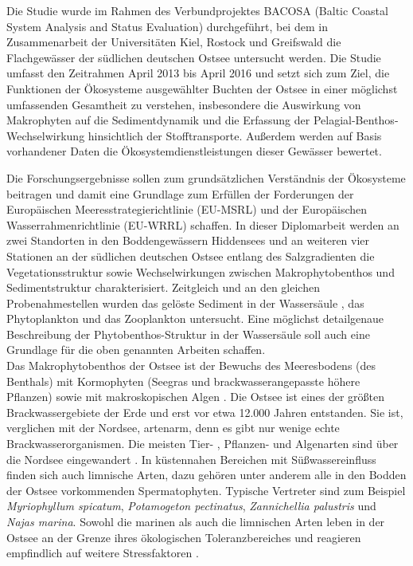 Die Studie wurde im Rahmen des Verbundprojektes BACOSA (Baltic Coastal System Analysis and Status Evaluation) durchgeführt, bei dem in Zusammenarbeit der Universitäten Kiel, Rostock und Greifswald die Flachgewässer der südlichen deutschen Ostsee untersucht werden. Die Studie umfasst den Zeitrahmen April 2013 bis April 2016 und setzt sich zum Ziel, die Funktionen der Ökosysteme ausgewählter Buchten der Ostsee in einer möglichst umfassenden Gesamtheit zu verstehen, insbesondere die Auswirkung von Makrophyten auf die Sedimentdynamik und die Erfassung der Pelagial-Benthos-Wechselwirkung hinsichtlich der Stofftransporte. Außerdem werden auf Basis vorhandener Daten die Ökosystemdienstleistungen dieser Gewässer bewertet. 

Die Forschungsergebnisse sollen zum grundsätzlichen Verständnis der Ökosysteme beitragen und damit eine Grundlage zum Erfüllen der Forderungen der Europäischen Meeresstrategierichtlinie (EU-MSRL) und der Europäischen Wasserrahmenrichtlinie (EU-WRRL) schaffen. In dieser Diplomarbeit werden an zwei Standorten in den Boddengewässern Hiddensees und an weiteren vier Stationen an der südlichen deutschen Ostsee entlang des Salzgradienten die Vegetationsstruktur sowie Wechselwirkungen zwischen Makrophytobenthos und Sedimentstruktur charakterisiert. Zeitgleich und an den gleichen Probenahmestellen wurden das gelöste Sediment in der Wassersäule \citep{kafka_2014}, das Phytoplankton \citep{lindner_2014} und das Zooplankton \citep{nawka_2014} untersucht. Eine möglichst detailgenaue Beschreibung der Phytobenthos-Struktur in der Wassersäule soll auch eine Grundlage für die oben genannten Arbeiten schaffen.
\\
Das Makrophytobenthos der Ostsee ist der Bewuchs des Meeresbodens (des Benthals) mit Kormophyten (Seegras und brackwasserangepasste höhere Pflanzen) sowie mit makroskopischen Algen \citep{schwenke_1995}. Die Ostsee ist eines der größten Brackwassergebiete der Erde und erst vor etwa 12.000 Jahren entstanden. Sie ist, verglichen mit der Nordsee, artenarm, denn es gibt nur wenige echte Brackwasserorganismen. Die meisten Tier- , Pflanzen- und Algenarten sind über die Nordsee eingewandert \citep{rheinheimer_1995}. In küstennahen Bereichen mit Süßwassereinfluss finden sich auch limnische Arten, dazu gehören unter anderem alle in den Bodden der Ostsee vorkommenden Spermatophyten. Typische Vertreter sind zum Beispiel \textit{Myriophyllum spicatum}, \textit{Potamogeton pectinatus}, \textit{Zannichellia palustris} und \textit{Najas marina}. Sowohl die marinen als auch die limnischen Arten leben in der Ostsee an der Grenze ihres ökologischen Toleranzbereiches und reagieren empfindlich auf weitere Stressfaktoren \citep{rheinheimer_1995}.

